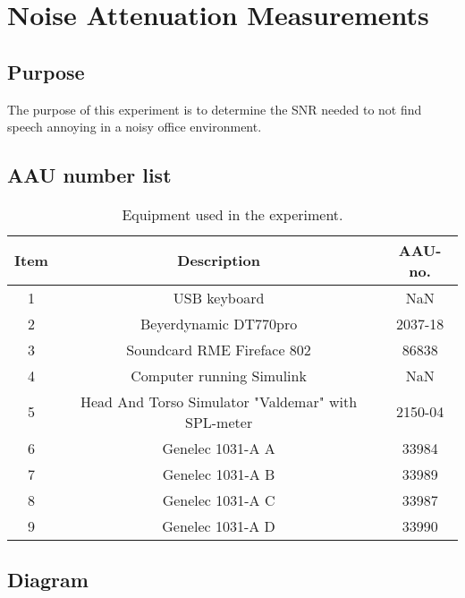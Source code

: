 \section{Noise Attenuation Measurements}

\subsection{Purpose}

The purpose of this experiment is to determine the SNR needed to not find speech annoying in a noisy office environment. 

\subsection{AAU number list}

\begin{table}[h]
	\centering
	
	\begin{tabular}{ c c c } \toprule
		{Item} & {Description} & {AAU-no}. \\ \bottomrule 
		1      	&  USB keyboard							& NaN		\\
		2      	&  Beyerdynamic DT770pro				& 2037-18	\\
		3      	&  Soundcard RME Fireface 802           & 86838		\\
		4      	&  Computer	running Simulink			& NaN		\\  
		5		&  Head And Torso Simulator "Valdemar" with SPL-meter					& 2150-04	\\
		6      	&  Genelec 1031-A A					& 33984		\\
		7      	&  Genelec 1031-A B					& 33989		\\
		8      	&  Genelec 1031-A C					& 33987		\\
		9      	&  Genelec 1031-A D					& 33990		\\ \bottomrule 
	\end{tabular}
	\caption{Equipment used in the experiment.}
	\label{tab:UsedEquipmentListningAttenuation}
\end{table}



\subsection{Diagram}

